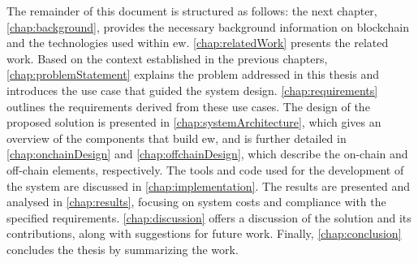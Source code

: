 The remainder of this document is structured as follows: the next chapter, \cref{chap:background}, provides the necessary background information on blockchain and the technologies used within \gls{ew}. \cref{chap:relatedWork} presents the related work. Based on the context established in the previous chapters, \cref{chap:problemStatement} explains the problem addressed in this thesis and introduces the use case that guided the system design. \cref{chap:requirements} outlines the requirements derived from these use cases.
The design of the proposed solution is presented in \cref{chap:systemArchitecture}, which gives an overview of the components that build \gls{ew}, and is further detailed in \cref{chap:onchainDesign} and \cref{chap:offchainDesign}, which describe the on-chain and off-chain elements, respectively. The tools and code used for the development of the system are discussed in \cref{chap:implementation}.
The results are presented and analysed in \cref{chap:results}, focusing on system costs and compliance with the specified requirements. \cref{chap:discussion} offers a discussion of the solution and its contributions, along with suggestions for future work. Finally, \cref{chap:conclusion} concludes the thesis by summarizing the work.